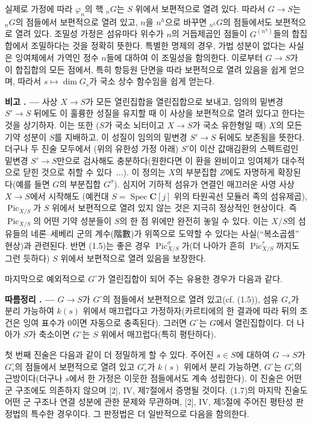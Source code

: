 \documentclass[11pt,twoside,openany]{book}
\numberwithin{equation}{section}
\newcommand{\sourceunit}{front}
\newcommand{\src}[1]{%
  \phantomsection\hypertarget{src:\sourceunit:#1}{}%
  \marginpar{\raggedleft\footnotesize\sffamily #1}%
}
\theoremstyle{plain}
\theoremstyle{definition}
\theoremstyle{remark}
\newcommand{\result}[2]{%
  \par\medskip\noindent\textbf{#1%
  \if\relax\detokenize{#2}\relax\else\space#2\fi. ---}\enspace
}
\begin{document}
실제로 가정에 따라 $\varphi_n$의 핵 ${}_nG$는 $S$ 위에서 보편적으로
열려 있다. 따라서 $G\longrightarrow S$는 ${}_nG$의 점들에서 보편적으로
열려 있고, $n$을 $n^h$으로 바꾸면 ${}_{n^h}G$의 점들에서도 보편적으로
열려 있다. 조밀성 가정은 섬유마다 위수가 $n$의 거듭제곱인 점들이
$G^{(n^h)}$들의 합집합에서 조밀하다는 것을 정확히 뜻한다. 특별한 명제의
경우, 가법 성분이 없다는 사실은 잉여체에서 가역인 정수 $n$들에 대하여
이 조밀성을 함의한다. 이로부터 $G\longrightarrow S$가 이 합집합의 모든
점에서, 특히 항등원 단면을 따라 보편적으로 열려 있음을 쉽게 얻으며,
따라서 $s\longmapsto\dim G_s$가 국소 상수 함수임을 쉽게 얻는다.

\result{비고}{1.6} 사상 $X\longrightarrow S$가 모든 열린집합을
열린집합으로 보내고, 임의의 밑변경 $S'\longrightarrow S$ 뒤에도 이 훌륭한
성질을 유지할 때 이 사상을 보편적으로 열려 있다고 한다는 것을 상기하자. 이는
또한 ($S$가 국소 뇌터이고 $X\longrightarrow S$가 국소 유한형일 때)
$X$의 모든 기약 성분이 $S$를 지배하고, 이 성질이 임의의 밑변경
$S'\longrightarrow S$ 뒤에도 보존됨을 뜻한다. 더구나 두 진술 모두에서
(위의 유한성 가정 아래) $S'$이 이산 값매김환의 스펙트럼인 밑변경
$S'\longrightarrow S$만으로 검사해도 충분하다(원한다면 이 환을 완비이고
잉여체가 대수적으로 닫힌 것으로 취할 수 있다~...). 이 정의는 $X$의 부분집합
$Z$에도 자명하게 확장된다(예를 들면 $G$의 부분집합 $G^\sigma$). 심지어
기하적 섬유가 연결인 매끄러운 사영 사상 $X\longrightarrow S$에서 시작해도
(예컨대 $S=\operatorname{Spec}\mathbf C[j]$ 위의 타원곡선 모듈러 족의
섬유제곱), $\operatorname{Pic}_{X/S}$가 $S$ 위에서 보편적으로 열려 있지
않는 것은 지극히 정상적인 현상이다. 즉
$\operatorname{Pic}_{X/S}$의 어떤 기약 성분들이 $S$의 한 점 위에만 완전히
놓일 수 있다. 이는 $X/S$의 섬유들의 네론--세베리 군의 계수(階數)가
위쪽으로 도약할 수 있다는 사실(``복소곱셈'' 현상)과 관련된다. 반면 (1.5)는
좋은 경우 $\operatorname{Pic}_{X/S}^\sigma$가(더 나아가 흔히
$\operatorname{Pic}_{X/S}^\tau$까지도 그런 듯하다) $S$ 위에서
보편적으로 열려 있음을 보장한다.

\src{229}
마지막으로 예외적으로 $G^\circ$가 열린집합이 되어 주는 유용한 경우가
다음과 같다.

\result{따름정리}{1.7} $G\longrightarrow S$가 $G^\circ$의 점들에서
보편적으로 열려 있고(cf. (1.5)), 섬유 $G_s$가 분리 가능하여 $k(s)$ 위에서
매끄럽다고 가정하자(카르티에의 한 결과에 따라 뒤의 조건은 잉여 표수가 0이면
자동으로 충족된다). 그러면 $G^\circ$는 $G$에서 열린집합이다. 더 나아가
$S$가 축소이면 $G^\circ$는 $S$ 위에서 매끄럽다(특히 평탄하다).

첫 번째 진술은 다음과 같이 더 정밀하게 할 수 있다. 주어진 $s\in S$에 대하여
$G\longrightarrow S$가 $G_s^\circ$의 점들에서 보편적으로 열려 있고
$G_s^\circ$가 $k(s)$ 위에서 분리 가능하면, $G^\circ$는
$G_s^\circ$의 근방이다(더구나 $s$에서 한 가정은 이웃한 점들에서도 계속
성립한다). 이 진술은 어떤 군 구조에도 의존하지 않으며 [2], IV, 제7절에서
증명될 것이다. (1.7)의 마지막 진술도 어떤 군 구조나 연결 성분에 관한
문제와 무관하며, [2], IV, 제5절에 주어진 평탄성 판정법의 특수한 경우이다.
그 판정법은 더 일반적으로 다음을 함의한다.
\end{document}
